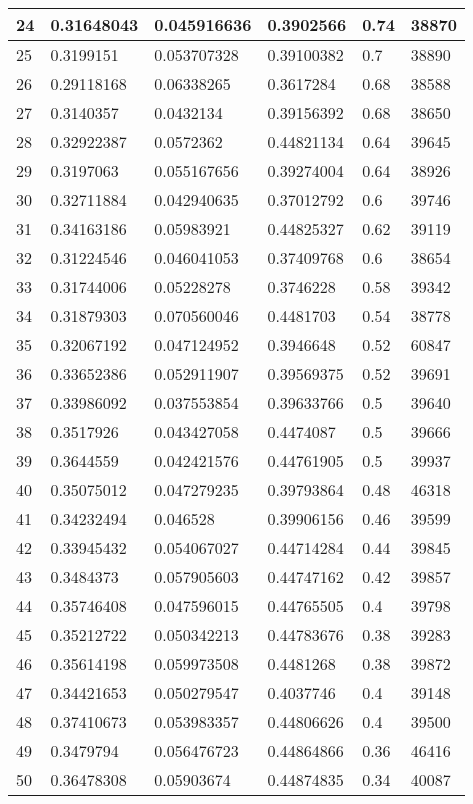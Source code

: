 \begin{longtable}{|l|l|l|l|l|l|}
24 & 0.31648043 & 0.045916636 & 0.3902566 & 0.74 & 38870 \\ \hline 
25 & 0.3199151 & 0.053707328 & 0.39100382 & 0.7 & 38890 \\ \hline 
26 & 0.29118168 & 0.06338265 & 0.3617284 & 0.68 & 38588 \\ \hline 
27 & 0.3140357 & 0.0432134 & 0.39156392 & 0.68 & 38650 \\ \hline 
28 & 0.32922387 & 0.0572362 & 0.44821134 & 0.64 & 39645 \\ \hline 
29 & 0.3197063 & 0.055167656 & 0.39274004 & 0.64 & 38926 \\ \hline 
30 & 0.32711884 & 0.042940635 & 0.37012792 & 0.6 & 39746 \\ \hline 
31 & 0.34163186 & 0.05983921 & 0.44825327 & 0.62 & 39119 \\ \hline 
32 & 0.31224546 & 0.046041053 & 0.37409768 & 0.6 & 38654 \\ \hline 
33 & 0.31744006 & 0.05228278 & 0.3746228 & 0.58 & 39342 \\ \hline 
34 & 0.31879303 & 0.070560046 & 0.4481703 & 0.54 & 38778 \\ \hline 
35 & 0.32067192 & 0.047124952 & 0.3946648 & 0.52 & 60847 \\ \hline 
36 & 0.33652386 & 0.052911907 & 0.39569375 & 0.52 & 39691 \\ \hline 
37 & 0.33986092 & 0.037553854 & 0.39633766 & 0.5 & 39640 \\ \hline 
38 & 0.3517926 & 0.043427058 & 0.4474087 & 0.5 & 39666 \\ \hline 
39 & 0.3644559 & 0.042421576 & 0.44761905 & 0.5 & 39937 \\ \hline 
40 & 0.35075012 & 0.047279235 & 0.39793864 & 0.48 & 46318 \\ \hline 
41 & 0.34232494 & 0.046528 & 0.39906156 & 0.46 & 39599 \\ \hline 
42 & 0.33945432 & 0.054067027 & 0.44714284 & 0.44 & 39845 \\ \hline 
43 & 0.3484373 & 0.057905603 & 0.44747162 & 0.42 & 39857 \\ \hline 
44 & 0.35746408 & 0.047596015 & 0.44765505 & 0.4 & 39798 \\ \hline 
45 & 0.35212722 & 0.050342213 & 0.44783676 & 0.38 & 39283 \\ \hline 
46 & 0.35614198 & 0.059973508 & 0.4481268 & 0.38 & 39872 \\ \hline 
47 & 0.34421653 & 0.050279547 & 0.4037746 & 0.4 & 39148 \\ \hline 
48 & 0.37410673 & 0.053983357 & 0.44806626 & 0.4 & 39500 \\ \hline 
49 & 0.3479794 & 0.056476723 & 0.44864866 & 0.36 & 46416 \\ \hline 
50 & 0.36478308 & 0.05903674 & 0.44874835 & 0.34 & 40087 \\ \hline 
\end{longtable}